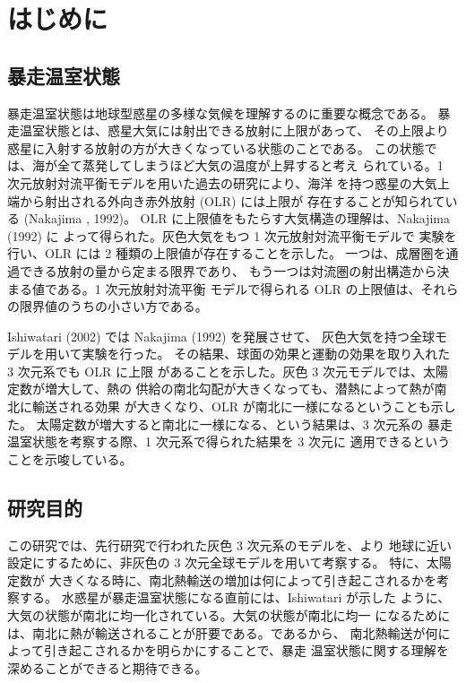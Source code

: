 \documentclass[body]{subfiles}
\begin{document}
\chapter{はじめに}

\section{暴走温室状態}
暴走温室状態は地球型惑星の多様な気候を理解するのに重要な概念である。
暴走温室状態とは、惑星大気には射出できる放射に上限があって、
その上限より惑星に入射する放射の方が大きくなっている状態のことである。
この状態では、海が全て蒸発してしまうほど大気の温度が上昇すると考え
られている。1 次元放射対流平衡モデルを用いた過去の研究により、海洋
を持つ惑星の大気上端から射出される外向き赤外放射 (OLR) には上限が
存在することが知られている (Nakajima \etal*, 1992)。
OLR に上限値をもたらす大気構造の理解は、Nakajima \etal (1992) に
よって得られた。灰色大気をもつ 1 次元放射対流平衡モデルで
実験を行い、OLR には 2 種類の上限値が存在することを示した。
一つは、成層圏を通過できる放射の量から定まる限界であり、
もう一つは対流圏の射出構造から決まる値である。1 次元放射対流平衡
モデルで得られる OLR の上限値は、それらの限界値のうちの小さい方である。

Ishiwatari \etal (2002) では Nakajima \etal (1992) を発展させて、
灰色大気を持つ全球モデルを用いて実験を行った。
その結果、球面の効果と運動の効果を取り入れた 3 次元系でも OLR に上限
があることを示した。灰色 3 次元モデルでは、太陽定数が増大して、熱の
供給の南北勾配が大きくなっても、潜熱によって熱が南北に輸送される効果
が大きくなり、OLR が南北に一様になるということも示した。
太陽定数が増大すると南北に一様になる、という結果は、3 次元系の
暴走温室状態を考察する際、1 次元系で得られた結果を 3 次元に
適用できるということを示唆している。

\section{研究目的}
この研究では、先行研究で行われた灰色 3 次元系のモデルを、より
地球に近い設定にするために、非灰色の 3 次元全球モデルを用いて考察する。
特に、太陽定数が
大きくなる時に、南北熱輸送の増加は何によって引き起こされるかを考察する。
水惑星が暴走温室状態になる直前には、Ishiwatari  が示した
ように、大気の状態が南北に均一化されている。大気の状態が南北に均一
になるためには、南北に熱が輸送されることが肝要である。であるから、
南北熱輸送が何によって引き起こされるかを明らかにすることで、暴走
温室状態に関する理解を深めることができると期待できる。
\end{document}
